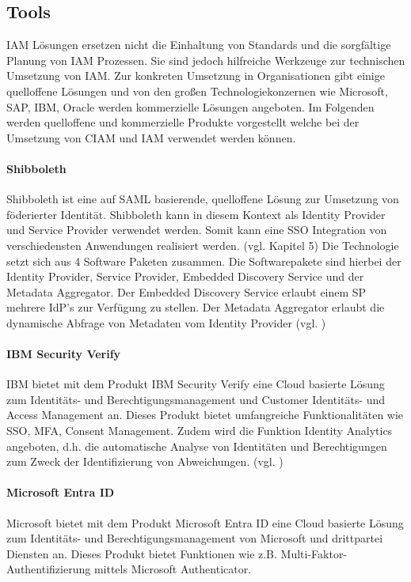 \documentclass[11pt]{article}
\begin{document}
\subsection{Tools}
IAM Lösungen ersetzen nicht die Einhaltung von Standards und die sorgfältige Planung von IAM Prozessen. Sie sind jedoch hilfreiche Werkzeuge zur technischen Umsetzung von IAM. Zur konkreten Umsetzung in Organisationen gibt einige quelloffene Lösungen und von den großen Technologiekonzernen wie Microsoft, SAP, IBM, Oracle werden kommerzielle Lösungen angeboten. Im Folgenden werden quelloffene und kommerzielle Produkte vorgestellt welche bei der Umsetzung von CIAM und IAM verwendet werden können.
\paragraph{Shibboleth}
Shibboleth ist eine auf SAML basierende, quelloffene Lösung zur Umsetzung von föderierter Identität. Shibboleth kann in diesem Kontext als Identity Provider und Service Provider verwendet werden. Somit kann eine SSO Integration von verschiedensten Anwendungen realisiert werden. (vgl. \cite{kamal2015shibboleth} Kapitel 5) Die Technologie setzt sich aus 4 Software Paketen zusammen. Die Softwarepakete sind hierbei der Identity Provider, Service Provider, Embedded Discovery Service und der Metadata Aggregator. Der Embedded Discovery Service erlaubt einem SP mehrere IdP's zur Verfügung zu stellen. Der Metadata Aggregator erlaubt die dynamische Abfrage von Metadaten vom Identity Provider (vgl. \cite{shibboleth2024software})
\paragraph{IBM Security Verify}
IBM bietet mit dem Produkt \glqq{}IBM Security Verify\grqq{} eine Cloud basierte Lösung zum Identitäts- und Berechtigungsmanagement und Customer Identitäts- und Access Management an. Dieses Produkt bietet umfangreiche Funktionalitäten wie SSO, MFA, Consent Management. Zudem wird die Funktion Identity Analytics angeboten, d.h. die automatische Analyse von Identitäten und Berechtigungen zum Zweck der Identifizierung von Abweichungen. (vgl. \cite{ibm2024verify})
\paragraph{Microsoft Entra ID}
Microsoft bietet mit dem Produkt \glqq{}Microsoft Entra ID\grqq{} eine Cloud basierte Lösung zum Identitäts- und Berechtigungsmanagement von Microsoft und drittpartei Diensten an. Dieses Produkt bietet Funktionen wie z.B. Multi-Faktor-Authentifizierung mittels Microsoft Authenticator.
\end{document}
